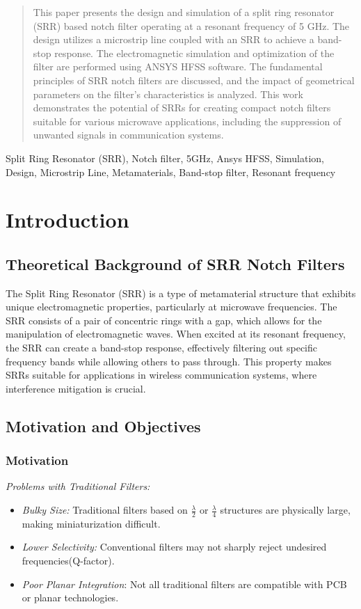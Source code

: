 \documentclass[conference]{IEEEtran}
\begin{document}
\begin{abstract}
This paper presents the design and simulation of a split ring resonator (SRR) based notch filter operating at a resonant frequency of 5 GHz. The design utilizes a microstrip line coupled with an SRR to achieve a band-stop response. The electromagnetic simulation and optimization of the filter are performed using ANSYS HFSS software. The fundamental principles of SRR notch filters are discussed, and the impact of geometrical parameters on the filter's characteristics is analyzed. This work demonstrates the potential of SRRs for creating compact notch filters suitable for various microwave applications, including the suppression of unwanted signals in communication systems.
\end{abstract}

\begin{IEEEkeywords}
Split Ring Resonator (SRR), Notch filter, 5GHz, Ansys HFSS, Simulation, Design, Microstrip Line, Metamaterials, Band-stop filter, Resonant frequency
\end{IEEEkeywords}

\section{Introduction}

\subsection{Theoretical Background of SRR Notch Filters}
The Split Ring Resonator (SRR) is a type of metamaterial structure that exhibits unique electromagnetic properties, particularly at microwave frequencies. The SRR consists of a pair of concentric rings with a gap, which allows for the manipulation of electromagnetic waves. When excited at its resonant frequency, the SRR can create a band-stop response, effectively filtering out specific frequency bands while allowing others to pass through. This property makes SRRs suitable for applications in wireless communication systems, where interference mitigation is crucial.

\subsection{Motivation and Objectives}
\subsubsection{Motivation}
\textit{Problems with Traditional Filters:} 
\begin{itemize}
    \item \textit{Bulky Size:} Traditional filters based on $ \frac{\lambda}{2} $ or $ \frac{\lambda}{4} $ structures are physically large, making miniaturization difficult.
    \item \textit{Lower Selectivity:} Conventional filters may not sharply reject undesired frequencies(Q-factor).
    \item \textit{Poor Planar Integration}: Not all traditional filters are compatible with PCB or planar technologies.
\end{itemize}
\end{document}
